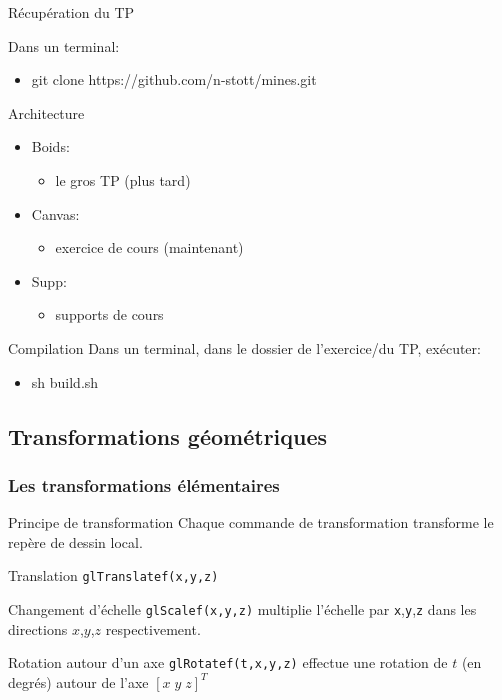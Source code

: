 \documentclass{beamer}
\begin{document}
\begin{frame}{Récupération du TP}

\begin{block}{Dans un terminal:}
\begin{itemize}
\item git clone https://github.com/n-stott/mines.git
\end{itemize}
\end{block}

\begin{block}{Architecture}
\begin{itemize}
\item Boids:
\begin{itemize}
\item  le gros TP (plus tard)
\end{itemize}
\item Canvas:
\begin{itemize}
\item exercice de cours (maintenant)
\end{itemize}
\item Supp:
\begin{itemize}
\item supports de cours
\end{itemize}
\end{itemize}
\end{block}

\begin{block}{Compilation}
Dans un terminal, dans le dossier de l'exercice/du TP, exécuter:
\begin{itemize}
\item sh build.sh
\end{itemize}
\end{block}

\end{frame}





\subsection{Transformations géométriques}

\begin{frame}
\frametitle{Les transformations élémentaires}
	\begin{alertblock}{Principe de transformation}
		Chaque commande de transformation transforme le repère de dessin local.
	\end{alertblock}
	\begin{block}{Translation}
		\verb!glTranslatef(x,y,z)! 
	\end{block}
	\begin{block}{Changement d'échelle}
		\verb!glScalef(x,y,z)! multiplie l'échelle par \verb!x!,\verb!y!,\verb!z! dans les directions $x$,$y$,$z$ respectivement.
	\end{block}
	\begin{block}{Rotation autour d'un axe}
		\verb!glRotatef(t,x,y,z)! effectue une rotation de $t$ (en degrés) autour de l'axe $[x\;y\;z]^T$
	\end{block}
\end{frame}
\end{document}

